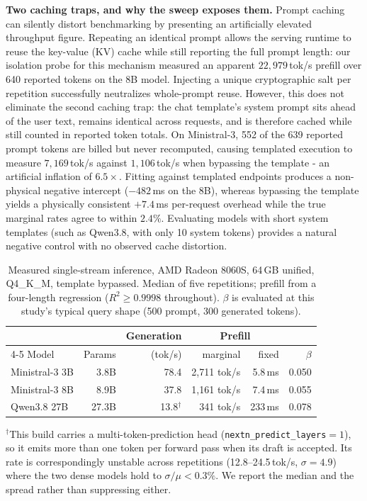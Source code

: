 \documentclass[conference]{IEEEtran}
\begin{document}
\textbf{Two caching traps, and why the sweep exposes them.}
Prompt caching can silently distort benchmarking by presenting an artificially
elevated throughput figure. Repeating an identical prompt allows the serving
runtime to reuse the key-value (KV) cache while still reporting the full prompt
length: our isolation probe for this mechanism measured an apparent
$22{,}979$\,tok/s prefill over 640 reported tokens on the 8B model. Injecting a
unique cryptographic salt per repetition successfully neutralizes whole-prompt
reuse. However, this does not eliminate the second caching trap: the chat
template's system prompt sits ahead of the user text, remains identical across
requests, and is therefore cached while still counted in reported token totals.
On Ministral-3, 552 of the 639 reported prompt tokens are billed but never
recomputed, causing templated execution to measure $7{,}169$\,tok/s against
$1{,}106$\,tok/s when bypassing the template - an artificial inflation of
$6.5\times$. Fitting against templated endpoints produces a non-physical
negative intercept ($-482$\,ms on the 8B), whereas bypassing the template yields
a physically consistent $+7.4$\,ms per-request overhead while the true marginal
rates agree to within $2.4\%$. Evaluating models with short system templates
(such as Qwen3.8, with only 10 system tokens) provides a natural negative
control with no observed cache distortion.

\begin{table}[t]
\caption{Measured single-stream inference, AMD Radeon 8060S, 64\,GB unified,
Q4\_K\_M, template bypassed. Median of five repetitions; prefill from a
four-length regression ($R^2 \ge 0.9998$ throughout). $\beta$ is evaluated at
this study's typical query shape (500 prompt, 300 generated tokens).}
\label{tab:measured}
\centering
\footnotesize
\renewcommand{\arraystretch}{1.15}
\setlength{\tabcolsep}{4pt}
\begin{tabular}{@{}lrrrrr@{}}
\toprule
 & & Generation & \multicolumn{2}{c}{Prefill} & \\
\cmidrule(lr){4-5}
Model & Params & (tok/s) & marginal & fixed & $\beta$ \\
\midrule
Ministral-3 3B & 3.8B & 78.4 & 2{,}711 tok/s & 5.8\,ms & 0.050 \\
Ministral-3 8B & 8.9B & 37.8 & 1{,}161 tok/s & 7.4\,ms & 0.055 \\
Qwen3.8 27B & 27.3B & 13.8$^{\dagger}$ & 341 tok/s & 233\,ms & 0.078 \\
\bottomrule
\end{tabular}

\vspace{2pt}
\footnotesize $^{\dagger}$This build carries a multi-token-prediction head
(\texttt{nextn\_predict\_layers}${=}1$), so it emits more than one token per
forward pass when its draft is accepted. Its rate is correspondingly unstable
across repetitions (12.8--24.5\,tok/s, $\sigma=4.9$) where the two dense models
hold to $\sigma/\mu < 0.3\%$. We report the median and the spread rather than
suppressing either.
\end{table}
\end{document}
